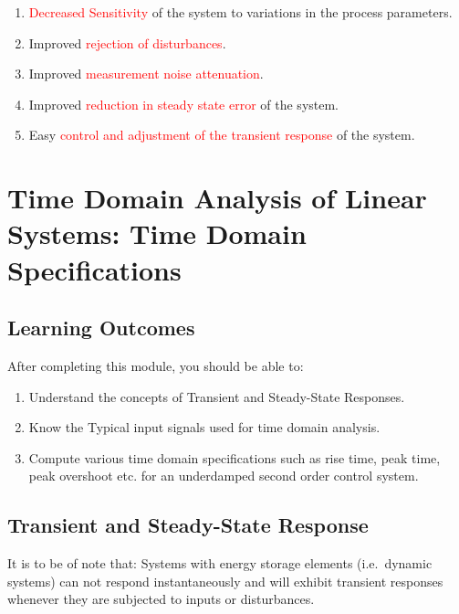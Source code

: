 \documentclass[
  14pt,
  a4paper,
  oneside,
  open=any,
  a4paper,
  14pt]{report}
\begin{document}
\begin{enumerate}
\def\labelenumi{\arabic{enumi}.}
\item
  \textcolor{red}{Decreased Sensitivity} of the system to variations in
  the process parameters.
\item
  Improved \textcolor{red}{rejection of disturbances}.
\item
  Improved \textcolor{red}{measurement noise attenuation}.
\item
  Improved \textcolor{red}{reduction in steady state error} of the
  system.
\item
  Easy \textcolor{red}{control and adjustment of the transient response}
  of the system.
\end{enumerate}

\chapter{Time Domain Analysis of Linear Systems: Time Domain
Specifications}\label{time-domain-analysis-of-linear-systems-time-domain-specifications}

\section*{Learning Outcomes}\label{learning-outcomes-3}


After completing this module, you should be able to:

\begin{enumerate}
\def\labelenumi{\arabic{enumi}.}
\item
  Understand the concepts of Transient and Steady-State Responses.
\item
  Know the Typical input signals used for time domain analysis.
\item
  Compute various time domain specifications such as rise time, peak
  time, peak overshoot etc. for an underdamped second order control
  system.
\end{enumerate}

\section{Transient and Steady-State
Response}\label{transient-and-steady-state-response}

It is to be of note that: Systems with energy storage elements
(i.e.~dynamic systems) can not respond instantaneously and will exhibit
transient responses whenever they are subjected to inputs or
disturbances.
\end{document}
